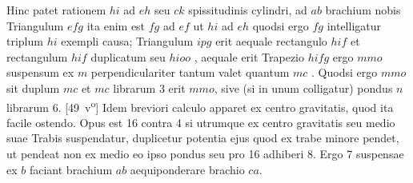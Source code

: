\hspace*{7.5mm}Hinc patet rationem $hi$ ad $eh$ seu $ck$ spissitudinis cylindri, ad $ab$ brachium  nobis Triangulum $efg$ ita enim est $fg$ ad $ef$ ut $hi$ ad $eh$ quodsi ergo $fg$ intelligatur triplum $hi$ exempli causa; Triangulum $ipg$ erit aequale rectangulo $hif$ et rectangulum $hif$ duplicatum seu $hioo$ , aequale erit Trapezio $hifg$ ergo $mmo$ suspensum ex $m$ perpendiculariter tantum valet quantum $mc$ .
Quodsi ergo $mmo$ sit duplum $mc$ et $mc$ librarum 3 erit  $mmo$, sive (si in unum colligatur) pondus\protect{} $n$ librarum 6.%
[49~v\textsuperscript{o}]
\pend
\count{}
\count{}
\count{}
\pstart%
Idem breviori calculo apparet ex centro gravitatis\protect{}, quod ita facile ostendo.
Opus est 16 contra 4 si utrumque ex centro gravitatis\protect{} seu medio suae Trabis suspendatur,
duplicetur potentia ejus quod ex trabe minore pendet,
ut pendeat non ex medio 
eo ipso  
pondus\protect{} seu pro 16 adhiberi 8. Ergo 7
suspensae ex $b$ faciant brachium $ab$ aequiponderare brachio $ca$.
\pend
\vspace{2em}%
\pstart%
